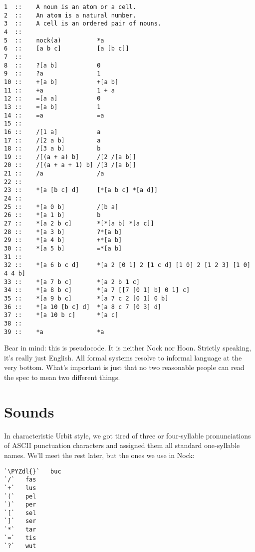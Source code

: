 \begin{framed_shaded}
\begin{Verbatim}[fontsize=\relsize{-2.5},fontseries=b,commandchars=\\\{\}]
1  ::    A noun is an atom or a cell.
2  ::    An atom is a natural number.
3  ::    A cell is an ordered pair of nouns.
4  ::
5  ::    nock(a)          *a
6  ::    [a b c]          [a [b c]]
7  ::
8  ::    ?[a b]           0
9  ::    ?a               1
10 ::    +[a b]           +[a b]
11 ::    +a               1 + a
12 ::    =[a a]           0
13 ::    =[a b]           1
14 ::    =a               =a
15 ::
16 ::    /[1 a]           a
17 ::    /[2 a b]         a
18 ::    /[3 a b]         b
19 ::    /[(a + a) b]     /[2 /[a b]]
20 ::    /[(a + a + 1) b] /[3 /[a b]]
21 ::    /a               /a
22 ::
23 ::    *[a [b c] d]     [*[a b c] *[a d]]
24 ::
25 ::    *[a 0 b]         /[b a]
26 ::    *[a 1 b]         b
27 ::    *[a 2 b c]       *[*[a b] *[a c]]
28 ::    *[a 3 b]         ?*[a b]
29 ::    *[a 4 b]         +*[a b]
30 ::    *[a 5 b]         =*[a b]
31 ::
32 ::    *[a 6 b c d]     *[a 2 [0 1] 2 [1 c d] [1 0] 2 [1 2 3] [1 0] 4 4 b]
33 ::    *[a 7 b c]       *[a 2 b 1 c]
34 ::    *[a 8 b c]       *[a 7 [[7 [0 1] b] 0 1] c]
35 ::    *[a 9 b c]       *[a 7 c 2 [0 1] 0 b]
36 ::    *[a 10 [b c] d]  *[a 8 c 7 [0 3] d]
37 ::    *[a 10 b c]      *[a c]
38 ::
39 ::    *a               *a
\end{Verbatim}
\end{framed_shaded}
Bear in mind: this is pseudocode.  It is neither Nock nor Hoon.
Strictly speaking, it's really just English.  All formal systems
resolve to informal language at the very bottom.  What's
important is just that no two reasonable people can read the spec
to mean two different things.

\section{Sounds}

In characteristic Urbit style, we got tired of three or
four-syllable pronunciations of ASCII punctuation characters and
assigned them all standard one-syllable names.  We'll meet the
rest later, but the ones we use in Nock:

\begin{framed_shaded}
\begin{Verbatim}[fontsize=\relsize{-2.5},fontseries=b,commandchars=\\\{\}]
`\PYZdl{}`   buc
`/`   fas
`+`   lus
`(`   pel
`)`   per
`[`   sel
`]`   ser
`*`   tar
`=`   tis
`?`   wut
\end{Verbatim}
\end{framed_shaded}

